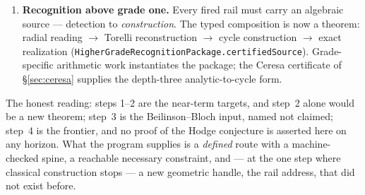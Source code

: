 \documentclass[11pt]{article}
\theoremstyle{definition}
\theoremstyle{remark}
\begin{document}
\begin{enumerate}
faithful realization of \S\ref{sec:semisimple} (finite support, distinct
frequencies, rational structure, extension/regulator compatibility, no
kernel); the realization is now a typed structure and retention transports
along any instance as a theorem (\texttt{FaithfulRealization.retention}).
\item \textbf{Recognition above grade one.} Every fired rail must carry an
algebraic source --- detection to \emph{construction}. The typed composition is
now a theorem: radial reading $\to$ Torelli reconstruction $\to$ cycle
construction $\to$ exact realization
(\texttt{HigherGradeRecognitionPackage.certifiedSource}). Grade-specific
arithmetic work instantiates the package; the Ceresa certificate of
\S\ref{sec:ceresa} supplies the depth-three analytic-to-cycle form.
\end{enumerate}

\noindent The honest reading: steps 1--2 are the near-term targets, and step~2
alone would be a new theorem; step~3 is the Beilinson--Bloch input, named not
claimed; step~4 is the frontier, and no proof of the Hodge conjecture is asserted
here on any horizon. What the program supplies is a \emph{defined} route with a
machine-checked spine, a reachable necessary constraint, and --- at the one step
where classical construction stops --- a new geometric handle, the rail address,
that did not exist before.
\end{document}

